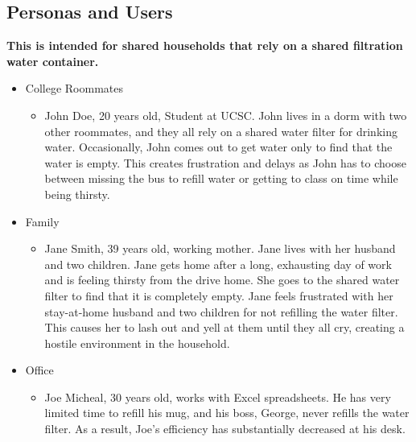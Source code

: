 \subsection{Personas and Users}

\textbf{This is intended for shared households that rely on a shared filtration water container.}

\begin{itemize}
    \item College Roommates
    \begin{itemize}
        \item John Doe, 20 years old, Student at UCSC. John lives in a dorm with two other roommates, and they all rely on a shared water filter for drinking water. Occasionally, John comes out to get water only to find that the water is empty. This creates frustration and delays as John has to choose between missing the bus to refill water or getting to class on time while being thirsty.
    \end{itemize}
    
    \item Family
    \begin{itemize}
        \item Jane Smith, 39 years old, working mother. Jane lives with her husband and two children. Jane gets home after a long, exhausting day of work and is feeling thirsty from the drive home. She goes to the shared water filter to find that it is completely empty. Jane feels frustrated with her stay-at-home husband and two children for not refilling the water filter. This causes her to lash out and yell at them until they all cry, creating a hostile environment in the household.
    \end{itemize}
    
    \item Office
    \begin{itemize}
        \item Joe Micheal, 30 years old, works with Excel spreadsheets. He has very limited time to refill his mug, and his boss, George, never refills the water filter. As a result, Joe's efficiency has substantially decreased at his desk.
    \end{itemize}
\end{itemize}
